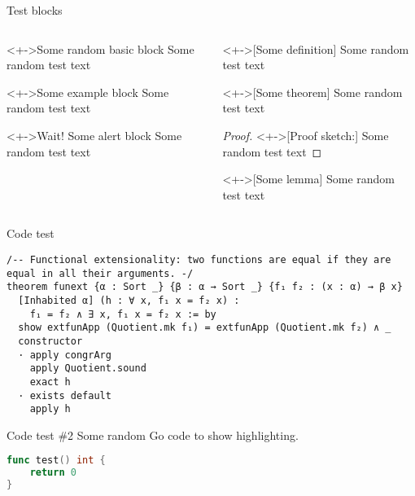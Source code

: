 \documentclass[%
	debug,
	sectionpage,
    listings={
        Lean=listings-lean,
        Go
    },
	withappendix,
	english,
]{rainbow-beamer}
\begin{document}
\begin{frame}{Test blocks}
	\begin{columns}
		\begin{column}{.45\linewidth}
			\begin{block}<+->{Some random basic block}
				Some random test text
			\end{block}
			\begin{exampleblock}<+->{Some example block}
				Some random test text
			\end{exampleblock}
			\begin{alertblock}<+->{Wait! Some alert block}
				Some random test text
			\end{alertblock}
		\end{column}
		\begin{column}{.45\linewidth}
			\begin{definition}<+->[Some definition]
				Some random test text
			\end{definition}
			\begin{theorem}<+->[Some theorem]
				Some random test text
			\end{theorem}
			\begin{proof}<+->[Proof sketch:]
				Some random test text
			\end{proof}
			\begin{lemma}<+->[Some lemma]
				Some random test text
			\end{lemma}
		\end{column}
	\end{columns}
\end{frame}


\begin{frame}[fragile]{Code test}
	\begin{lstlisting}[language=Lean]
/-- Functional extensionality: two functions are equal if they are equal in all their arguments. -/
theorem funext {α : Sort _} {β : α → Sort _} {f₁ f₂ : (x : α) → β x}
  [Inhabited α] (h : ∀ x, f₁ x = f₂ x) : 
    f₁ = f₂ ∧ ∃ x, f₁ x = f₂ x := by
  show extfunApp (Quotient.mk f₁) = extfunApp (Quotient.mk f₂) ∧ _
  constructor 
  · apply congrArg
    apply Quotient.sound
    exact h
  · exists default
    apply h
\end{lstlisting}
\end{frame}

\begin{frame}[fragile]{Code test \#2}
	Some random Go code to show highlighting.

	\begin{lstlisting}[language=Go]
func test() int {
    return 0
}
\end{lstlisting}
\end{frame}
\end{document}
